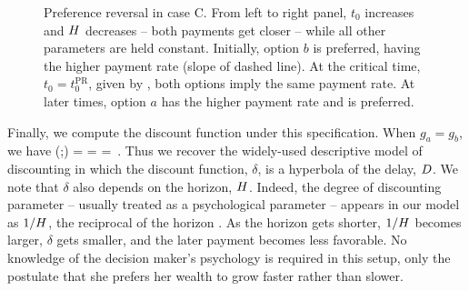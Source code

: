 \begin{figure}[!htb]
\centering
{}
\caption{Preference reversal in case C. From left to right panel, $t_0$ increases and $H$ decreases -- \ie both payments get closer -- while all other parameters are held constant. Initially, option $b$ is preferred, having the higher payment rate (slope of dashed line). At the critical time, $t_0=t_0^\text{PR}$, given by , both options imply the same payment rate. At later times, option $a$ has the higher payment rate and is preferred.}
\end{figure}

Finally, we compute the discount function under this specification. When $g_a=g_b$, we have
%
\be
\delta\left(\del;\hor\right) =  = \frac{\hor}{\hor +\del} = \,.
\ee
%
Thus we recover the widely-used descriptive model of discounting in which the discount function, $\delta$, is a hyperbola of the delay, $D$. We note that $\delta$ also depends on the horizon, $H$. Indeed, the degree of discounting parameter -- usually treated as a psychological parameter -- appears in our model as $1/H$, the reciprocal of the horizon \citep{MyersonGreen1995}. As the horizon gets shorter, $1/H$ becomes larger, $\delta$ gets smaller, and the later payment becomes less favorable. No knowledge of the decision maker's psychology is required in this setup, only the postulate that she prefers her wealth to grow faster rather than slower.

